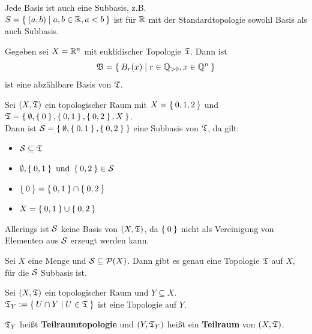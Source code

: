 \begin{beispiel}
    \begin{bspenum}
        \item Jede Basis ist auch eine Subbasis, z.B.\\
              $S=\Set{ (a,b) | a,b \in \ensuremath{\mathbb{R}}, a<b }$ ist für $\mathbb{R}$ mit der 
              Standardtopologie sowohl Basis als auch Subbasis.
        \item Gegeben sei $X = \mathbb{R}^n$ mit euklidischer Topologie $\mathfrak{T}$. Dann ist
              \[\mathfrak{B} = \Set{B_r(x) | r \in \ensuremath{\mathbb{Q}}_{> 0}, x \in \ensuremath{\mathbb{Q}}^n}\]
              ist eine abzählbare Basis von $\mathfrak{T}$.
        \item Sei $(X, \mathfrak{T})$ ein topologischer Raum mit 
              $X = \Set{0,1,2}$ und $\mathfrak{T} = \Set{\emptyset, \Set{0}, \Set{0,1}, \Set{0,2}, X}$.\\
              Dann ist $\mathcal{S} = \Set{\emptyset, \Set{0,1}, \Set{0,2}}$ eine Subbasis von 
              $\mathfrak{T}$, da gilt:
              \begin{itemize}
                \item $\mathcal{S} \subseteq \mathfrak{T}$
                \item $\emptyset,\Set{0,1} \text{ und } \Set{0,2} \in \mathcal{S}$
                \item $\Set{0} = \Set{0, 1} \cap \Set{0,2}$
                \item $X = \Set{0,1} \cup \Set{0,2}$
              \end{itemize}
              Allerings ist $\mathcal{S}$ keine Basis von $(X, \mathfrak{T})$, da
              $\Set{0}$ nicht als Vereinigung von Elementen aus $\mathcal{S}$
              erzeugt werden kann.
    \end{bspenum}
\end{beispiel}

\begin{bemerkung}
    Sei $X$ eine Menge und $\mathcal{S} \subseteq \mathcal{P}(X)$. Dann gibt es
    genau eine Topologie $\mathfrak{T}$ auf $X$, für die $\mathcal{S}$ Subbasis ist.
\end{bemerkung}

\begin{definition}%
    Sei $(X, \mathfrak{T})$ ein topologischer Raum und $Y \subseteq X$.\\
    $\mathfrak{T}_Y := \Set{U \cap Y | U \in \mathfrak{T}}$ ist eine Topologie auf $Y$.

    $\mathfrak{T}_Y$ heißt \textbf{Teilraumtopologie} und $(Y, \mathfrak{T}_Y)$ heißt ein 
    \textbf{Teilraum} von $(X, \mathfrak{T})$.
\end{definition}

